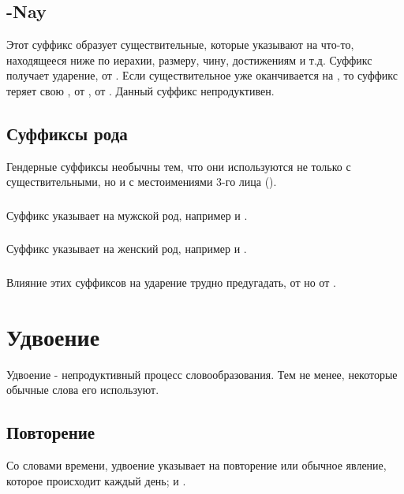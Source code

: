 \subsection{-Nay} Этот суффикс образует существительные, которые указывают на что-то, находящееся ниже по иерахии, размеру, чину, достижениям и т.д.
Суффикс получает ударение,   от  .  Если существительное уже оканчивается на
, то суффикс теряет свою , 
 от  , 
 от  .  Данный суффикс непродуктивен.


\subsection{Суффиксы рода} Гендерные суффиксы необычны тем, что они используются не только с существительными, но и с местоимениями 3-го лица
().  \label{lingop:suffix:gender}

\subsubsection{} Суффикс  указывает на мужской род, например
  и  .

\subsubsection{} Суффикс  указывает на женский род, например
  и  .

\subsubsection{} Влияние этих суффиксов на ударение трудно предугадать,   от 
 но   от
 .


\section{Удвоение}
\noindent Удвоение - непродуктивный процесс словообразования.
Тем не менее, некоторые обычные слова его используют. 

\subsection{Повторение} Со словами времени, удвоение указывает на повторение или обычное явление,   которое происходит каждый день; и  .

